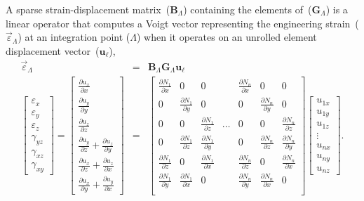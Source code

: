 \documentclass[]             %
{NASA}                       %
\begin{document}
 A sparse strain-displacement matrix~($\mathbf{B}_{\Lambda}$) 
 containing the elements of~($\mathbf{G}_{\Lambda}$) is a linear operator that computes a Voigt
 vector representing the engineering strain~($\vec{\varepsilon}_{\Lambda}$)
 at an integration point ($\Lambda$) when it operates on an unrolled
 element displacement vector~($\mathbf{u}_{\ell}$),
\begin{eqnarray}
\vec{\varepsilon}_{\Lambda} & = & \mathbf{B}_{\Lambda}\mathbf{G}_{\Lambda}\mathbf{u}_{\ell}\label{eq:voigt-strain-from-displacement}\\
\left[\begin{array}{c}
\varepsilon_{x}\\
\varepsilon_{y}\\
\varepsilon_{z}\\
\gamma_{yz}\\
\gamma_{xz}\\
\gamma_{xy}
\end{array}\right]=\left[\begin{array}{c}
\frac{\partial u_{x}}{\partial x}\\
\frac{\partial u_{y}}{\partial y}\\
\frac{\partial u_{z}}{\partial z}\\
\frac{\partial u_{y}}{\partial z}+\frac{\partial u_{z}}{\partial y}\\
\frac{\partial u_{x}}{\partial z}+\frac{\partial u_{z}}{\partial x}\\
\frac{\partial u_{x}}{\partial y}+\frac{\partial u_{y}}{\partial x}
\end{array}\right] 
& = & \left[\begin{array}{ccccccc}
\frac{\partial N_{1}}{\partial x} & 0 & 0 &  & \frac{\partial N_{n}}{\partial x} & 0 & 0\\
0 & \frac{\partial N_{1}}{\partial y} & 0 &  & 0 & \frac{\partial N_{n}}{\partial y} & 0\\
0 & 0 & \frac{\partial N_{1}}{\partial z} & \ldots & 0 & 0 & \frac{\partial N_{n}}{\partial z}\\
0 & \frac{\partial N_{1}}{\partial z} & \frac{\partial N_{1}}{\partial y} &  & 0 & \frac{\partial N_{n}}{\partial z} & \frac{\partial N_{n}}{\partial y}\\
\frac{\partial N_{1}}{\partial z} & 0 & \frac{\partial N_{1}}{\partial x} &  & \frac{\partial N_{n}}{\partial z} & 0 & \frac{\partial N_{n}}{\partial x}\\
\frac{\partial N_{1}}{\partial y} & \frac{\partial N_{1}}{\partial x} & 0 &  & \frac{\partial N_{n}}{\partial y} & \frac{\partial N_{n}}{\partial x} & 0\\
\end{array}\right]\left[\begin{array}{c}
u_{1x}\\
u_{1y}\\
u_{1z}\\
\vdots\\
u_{nx}\\
u_{ny}\\
u_{nz}
\end{array}\right]\text{.} \nonumber 
\end{eqnarray}
\end{document}
